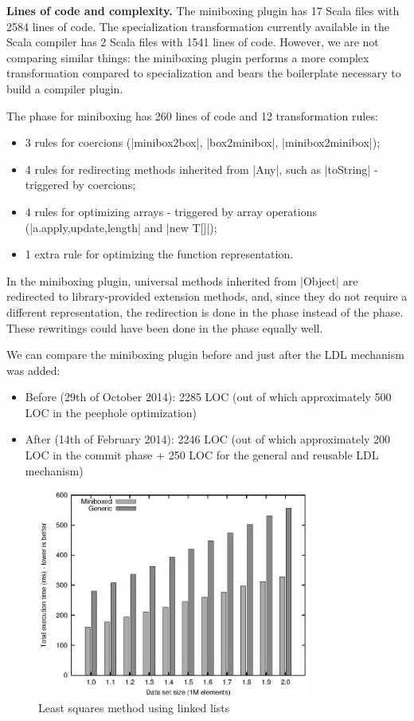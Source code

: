 \textbf{Lines of code and complexity.} The miniboxing plugin has 17 Scala files with 2584 lines of code. The specialization transformation currently available in the Scala compiler \cite{iuli-thesis} has 2 Scala files with 1541 lines of code. However, we are not comparing similar things: the miniboxing plugin performs a more complex transformation compared to specialization and bears the boilerplate necessary to build a compiler plugin.

The \commit{} phase for miniboxing has 260 lines of code and 12 transformation rules:
\begin{itemize}
\item 3 rules for coercions (|minibox2box|, |box2minibox|, |minibox2minibox|);
\item 4 rules for redirecting methods inherited from |Any|, such as |toString| - triggered by coercions;
\item 4 rules for optimizing arrays - triggered by array operations (|a.{apply,update,length}| and |new T[]|);
\item 1 extra rule for optimizing the function representation.
\end{itemize}

In the miniboxing plugin, universal methods inherited from |Object| are redirected to library-provided extension methods, and, since they do not require a different representation, the redirection is done in the \commit{} phase instead of the \coerce{} phase. These rewritings could have been done in the \coerce{} phase equally well.

We can compare the miniboxing plugin before and just after the LDL mechanism was added:
\begin{itemize}
\item Before (29th of October 2014): 2285 LOC (out of which approximately 500 LOC in the peephole optimization)
\item After (14th of February 2014): 2246 LOC (out of which approximately 200 LOC in the commit phase + 250 LOC for the general and reusable LDL mechanism)
\end{itemize}


\begin{figure}[t!]
\centering
\includegraphics[width=0.80\textwidth]{graph.eps}
\caption{Least squares method using linked lists}
\label{ldl:fig:linkedlist}

\end{figure}

